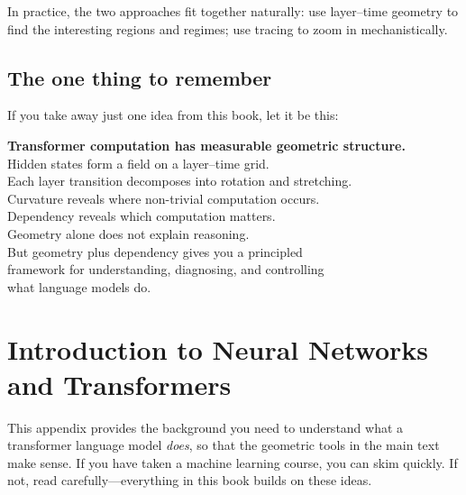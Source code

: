 \documentclass[11pt, twoside, openright]{memoir}
\begin{document}
In practice, the two approaches fit together naturally: use layer--time
geometry to find the interesting regions and regimes; use tracing to zoom in
mechanistically.

\section{The one thing to remember}

If you take away just one idea from this book, let it be this:

\begin{tcolorbox}[base, colback=LGreen, colframe=DGreen, boxrule=2pt]
\centering\large
\textbf{Transformer computation has measurable geometric structure.}\\[6pt]
\normalsize
Hidden states form a field on a layer--time grid.\\
Each layer transition decomposes into rotation and stretching.\\
Curvature reveals where non-trivial computation occurs.\\
Dependency reveals which computation matters.\\[6pt]
Geometry alone does not explain reasoning.\\
But geometry plus dependency gives you a principled\\
framework for understanding, diagnosing, and controlling\\
what language models do.
\end{tcolorbox}


\appendix


\chapter{Introduction to Neural Networks and Transformers}
\label{app:nn-transformers}


This appendix provides the background you need to understand what a
transformer language model \emph{does}, so that the geometric tools in the
main text make sense. If you have taken a machine learning course, you can
skim quickly. If not, read carefully---everything in this book builds on
these ideas.
\end{document}
